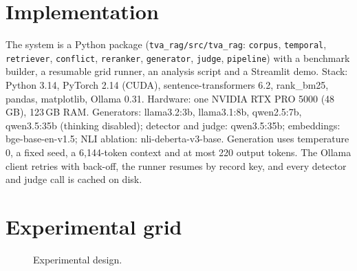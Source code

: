 \documentclass[11pt,a4paper]{report}
\begin{document}
\section{Implementation}
The system is a Python package (\texttt{tva\_rag/src/tva\_rag}: \texttt{corpus}, \texttt{temporal}, \texttt{retriever}, \texttt{conflict}, \texttt{reranker}, \texttt{generator}, \texttt{judge}, \texttt{pipeline}) with a benchmark builder, a resumable grid runner, an analysis script and a Streamlit demo. Stack: Python 3.14, PyTorch 2.14 (CUDA), sentence-transformers 6.2, rank\_bm25, pandas, matplotlib, Ollama 0.31. Hardware: one NVIDIA RTX PRO 5000 (48\,GB), 123\,GB RAM. Generators: llama3.2:3b, llama3.1:8b, qwen2.5:7b, qwen3.5:35b (thinking disabled); detector and judge: qwen3.5:35b; embeddings: bge-base-en-v1.5; NLI ablation: nli-deberta-v3-base. Generation uses temperature 0, a fixed seed, a 6,144-token context and at most 220 output tokens. The Ollama client retries with back-off, the runner resumes by record key, and every detector and judge call is cached on disk.

\section{Experimental grid}
\begin{figure}[htbp]\centering
{}
\caption{Experimental design.}
\end{figure}
\end{document}
